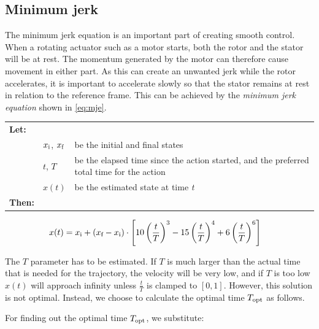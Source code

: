 \documentclass[11pt]{article}
\begin{document}
\subsection{Minimum jerk}
\label{sec:mje}
The minimum jerk equation is an important part of creating smooth control. When a rotating actuator such as a motor starts, both the rotor and the stator will be at rest. The momentum generated by the motor can therefore cause movement in either part. As this can create an unwanted jerk while the rotor accelerates, it is important to accelerate slowly so that the stator remains at rest in relation to the reference frame. This can be achieved by the \emph{minimum jerk equation} shown in \vref{eq:mje}.
\par \vspace{10pt}
{\footnotesize
  \begin{tabular}{l l l}
    \textbf{Let:} \\
 &$x_\textup{i}$, $x_\textup{f}$ &be the initial and final states\\
 &$t$, $T$ &be the elapsed time since the action started, and the preferred total time for the action  \\
 &$x(t)$ &be the estimated state at time \emph{t} \\
    \textbf{Then:}
  \end{tabular}
  \begin{align}
    x(t) &= x_\textup{i} +  (x_\textup{f} - x_\textup{i}) \cdot \left[10\left(\frac{t}{T}\right)^3 - 15\left(\frac{t}{T}\right)^4 + 6\left(\frac{t}{T}\right)^6 \right]\label{eq:mje}          
  \end{align}}
The $T$ parameter has to be estimated. If $T$ is much larger than  the actual time that is needed for the trajectory, the velocity will be very low, and if $T$ is too low $x(t)$ will approach infinity unless $\frac{t}{T}$ is clamped to $[0,1]$. However, this solution is not optimal. Instead, we choose to calculate the optimal time $T_\textup{opt}$ as follows.%
\par
For finding out the optimal time $T_\textup{opt}$, we substitute:
\end{document}
